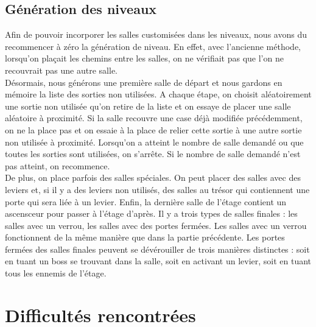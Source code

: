 \documentclass[10pt,a4paper]{article}
\begin{document}
\subsection{Génération des niveaux}

Afin de pouvoir incorporer les salles customisées dans les niveaux, nous avons du recommencer à zéro la génération de niveau. En effet, avec l'ancienne méthode, lorsqu'on plaçait les chemins entre les salles, on ne vérifiait pas que l'on ne recouvrait pas une autre salle.\\
Désormais, nous générons une première salle de départ et nous gardons en mémoire la liste des sorties non utilisées. A chaque étape, on choisit aléatoirement une sortie non utilisée qu'on retire de la liste et on essaye de placer une salle aléatoire à proximité. Si la salle recouvre une case déjà modifiée précédemment, on ne la place pas et on essaie à la place de relier cette sortie à une autre sortie non utilisée à proximité. Lorsqu'on a atteint le nombre de salle demandé ou que toutes les sorties sont utilisées, on s'arrête. Si le nombre de salle demandé n'est pas atteint, on recommence.\\
De plus, on place parfois des salles spéciales. On peut placer des salles avec des leviers et, si il y a des leviers non utilisés, des salles au trésor qui contiennent une porte qui sera liée à un levier. Enfin, la dernière salle de l'étage contient un ascensceur pour passer à l'étage d'après. Il y a trois types de salles finales : les salles avec un verrou, les salles avec des portes fermées. Les salles avec un verrou fonctionnent de la même manière que dans la partie précédente. Les portes fermées des salles finales peuvent se dévérouiller de trois manières distinctes : soit en tuant un boss se trouvant dans la salle, soit en activant un levier, soit en tuant tous les ennemis de l'étage.\\

\section{Difficultés rencontrées}
\end{document}
